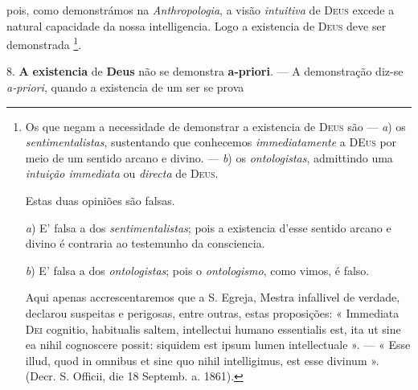  pois, como demonstrámos na \emph{Anthropologia}, a visão \emph{intuitiva} de \textsc{Deus} excede a natural capacidade da nossa intelligencia. Logo a existencia de \textsc{Deus} deve ser demonstrada \footnote{Os que negam a necessidade de demonstrar a existencia de \textsc{Deus} são --- \emph{a}) os \emph{sentimentalistas}, sustentando que conhecemos \emph{immediatamente} a \textsc{DEus} por meio de um sentido arcano e divino. --- \emph{b}) os \emph{ontologistas}, admittindo uma \emph{intuição immediata} ou \emph{directa} de \textsc{Deus}.\par Estas duas opiniões são falsas.\par \emph{a}) E' falsa a dos \emph{sentimentalistas}; pois a existencia d'esse sentido arcano e divino é contraria ao testemunho da consciencia.\par \emph{b}) E' falsa a dos \emph{ontologistas}; pois o \emph{ontologismo}, como vimos, é falso.\par Aqui apenas accrescentaremos que a S. Egreja, Mestra infallivel de verdade, declarou suspeitas e perigosas, entre outras, estas proposições: « Immediata \textsc{Dei} cognitio, habitualis saltem, intellectui humano essentialis est, ita ut sine ea nihil cognoscere possit: siquidem est ipsum lumen intellectuale ». --- « Esse illud, quod in omnibus et sine quo nihil intelligimus, est esse divinum ». (Decr. S. Officii, die 18 Septemb. a. 1861).}.

8. \textbf{A} \textbf{existencia} de \textbf{Deus} não se demonstra \textbf{a-priori}. --- A demonstração diz-se \emph{a-priori}, quando a existencia de um ser se prova